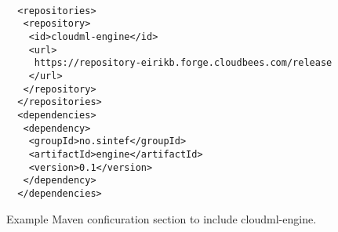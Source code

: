\begin{figure}
  \begin{center}
    \begin{verbatim}

  <repositories>
   <repository>
    <id>cloudml-engine</id>
    <url>
     https://repository-eirikb.forge.cloudbees.com/release
    </url>
   </repository>
  </repositories>
  <dependencies>
   <dependency>
    <groupId>no.sintef</groupId>
    <artifactId>engine</artifactId>
    <version>0.1</version>
   </dependency>
  </dependencies>
    \end{verbatim}
  \end{center}
  \caption{Example Maven conficuration section to include cloudml-engine.}
  \label{fig:pom-example}
\end{figure}

